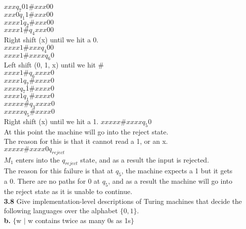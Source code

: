\documentclass[12pt]{article}
\begin{document}
$xxx                q_7    01 \# xxx00$ \\
$xxx0               q_1     1 \# xxx00$ \\
$xxxx1              q_2       \# xxx00$ \\
$xxxx1 \#           q_4          xxx00$ \\
Right shift (x) until we hit a 0.       \\
$xxxx1 \# xxx       q_4             00$ \\
$xxxx1 \# xxxx      q_6              0$ \\
Left shift (0, 1, x) until we hit  $\#$ \\
$xxxx1 \#           q_6          xxxx0$ \\
$xxxx1              q_7      \#  xxxx0$ \\
$xxxx               q_7    1 \#  xxxx0$ \\
$xxxx1              q_1      \#  xxxx0$ \\
$xxxxx  \#          q_3          xxxx0$ \\
$xxxxx              q_5      \#  xxxx0$ \\
Right shift (x) until we hit a 1.
$xxxxx \#  xxxx     q_5              0$ \\
At this point the machine will go into the reject state. \\
The reason for this is that it cannot read a 1, or an x. \\
$xxxxx \#  xxxx0    q_{reject}        $ \\
$M_1$ enters into the $q_{reject}$ state, and as a result the input is rejected. \\

The reason for this failure is that at $q_5$, the machine expects a 1 but it gets \\
a 0. There are no paths for 0 at $q_5$, and as a result the machine will go into \\
the reject state as it is unable to continue. \\

\pagebreak
\textbf{3.8} Give implementation-level descriptions of Turing machines that decide the following
languages over the alphabet $\{0,1\}$. \\
\textbf{b.} $\{$w $\mid$ w contains twice as many 0s as 1s$\}$ \\
\end{document}
